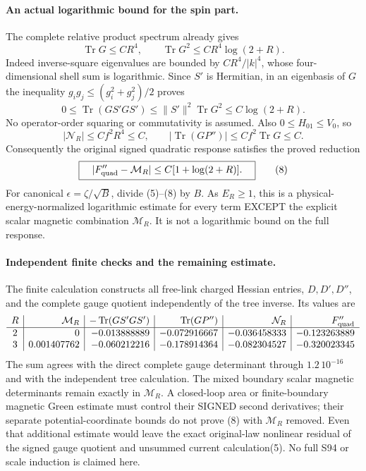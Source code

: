 \documentclass[11pt]{article}
\begin{document}
\paragraph{An actual logarithmic bound for the spin part.}
The complete relative product spectrum already gives
\[
 \operatorname{Tr}G\le CR^4,\qquad
 \operatorname{Tr}G^2\le CR^4\log(2+R).
\]
Indeed inverse-square eigenvalues are bounded by
$CR^4/|k|^4$, whose four-dimensional shell sum is logarithmic.
Since $S'$ is Hermitian, in an eigenbasis of $G$ the inequality
$g_i g_j\le(g_i^2+g_j^2)/2$ proves
\[
 0\le\operatorname{Tr}(GS'GS')
 \le\|S'\|^2\operatorname{Tr}G^2\le C\log(2+R).                    \tag{6}
\]
No operator-order squaring or commutativity is assumed.
Also $0\le H_{01}\le V_0$, so
\[
 |\mathcal N_R|\le C f^2 R^4\le C,\qquad
 |\operatorname{Tr}(GP'')|\le C f^2\operatorname{Tr}G\le C.         \tag{7}
\]
Consequently the original signed quadratic response satisfies the
proved reduction
\[
 \boxed{\quad |F_{\rm quad}''-\mathcal M_R|
                  \le C[1+\log(2+R)].\quad}                       \tag{8}
\]
For canonical $\epsilon=\zeta/\sqrt B$, divide (5)--(8) by $B$.
As $E_R\ge1$, this is a physical-energy-normalized logarithmic estimate
for every term EXCEPT the explicit scalar magnetic combination
$\mathcal M_R$. It is not a logarithmic bound on the full response.

\paragraph{Independent finite checks and the remaining estimate.}
The finite calculation constructs all
free-link charged Hessian entries, $D,D',D''$, and the complete gauge
quotient independently of the tree inverse. Its values are
\[
\begin{array}{c|r|r|r|r|r}
R&\mathcal M_R&-\operatorname{Tr}(GS'GS')&
\operatorname{Tr}(GP'')&\mathcal N_R&F_{\rm quad}''\\ \hline
2&0&-0.013888889&-0.072916667&-0.036458333&-0.123263889\\
3&0.001407762&-0.060212216&-0.178914364&-0.082304527&-0.320023345
\end{array}
\]
The sum agrees with the direct complete gauge determinant through
$1.2\,10^{-16}$ and with the independent tree calculation.
The mixed boundary scalar magnetic determinants remain exactly in
$\mathcal M_R$. A closed-loop area or finite-boundary magnetic Green
estimate must control their SIGNED second derivatives; their separate
potential-coordinate bounds do not prove (8) with $\mathcal M_R$ removed.
Even that additional estimate would leave the exact original-law
nonlinear residual of the signed gauge quotient and unsummed current calculation(5). No full S94 or scale induction is
claimed here.
\end{document}
